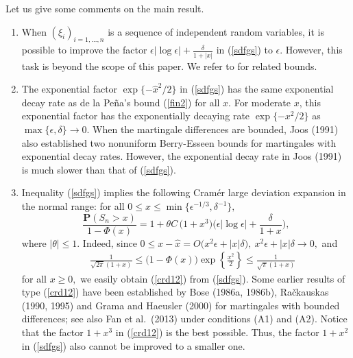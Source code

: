 \documentclass{gSTA2e}
\theoremstyle{plain}
\theoremstyle{definition}
\theoremstyle{remark}
\begin{document}
Let us give some  comments on the main result.
\begin{enumerate}
\item When  $(\xi _i)_{i=1,...,n}$
is a sequence of independent random variables, it is possible to improve the factor $  \epsilon|\log \epsilon| +\frac{\delta }{1 +|x| } $ in (\ref{sdfgs})  to  $\epsilon.$    However, this task is beyond the scope of this paper.
We refer to \cite{FGL14} for related bounds.


\item The exponential factor  $\exp\{- \widehat{x}^2/2 \}$ in (\ref{sdfgs}) has the same exponential decay rate as de la Pe\~{n}a's bound (\ref{fin2}) for all $x.$  For moderate $x$, this  exponential factor  has the exponentially decaying rate $\exp\{-x^2/2\}$ as $\max\{\epsilon, \delta\}\rightarrow 0$.
When the martingale differences are bounded, Joos (1991)  also established two nonuniform Berry-Esseen bounds for martingales with exponential decay rates. However, the  exponential decay rate  in Joos (1991) is much slower than that  of  (\ref{sdfgs}).

\item Inequality (\ref{sdfgs})  implies the following Cram\'{e}r large deviation expansion in the normal range: for all $0 \leq x  \leq \min\{\epsilon^{-1/3}, \delta^{-1} \},$
\begin{equation}\label{crd12}
\frac{\mathbf{P}(S_n > x)}{ 1- \Phi \left( x\right)}=  1 + \theta C\,\Big( 1+ x^3 \Big)\Big(  \epsilon|\log \epsilon| +\frac{\delta }{1 +x   } \Big),
\end{equation}
where $|\theta|\leq 1$.    Indeed, since $
0\leq x-\widehat{x}=O\Big(x^2\epsilon+ |x|\delta \Big), \   x^2\epsilon+ |x|\delta \rightarrow 0,$
and
\begin{eqnarray}
\ \ \ \ \ \  \frac{1}{\sqrt{2\pi}(1+x)}   \leq \Big( 1-\Phi \left( x\right) \Big) \exp\left\{ \frac{x^2}{2}\right\} \leq \frac{1}{\sqrt{\pi}(1+x)} \label{mc}
\end{eqnarray}
for all $x\geq0,$
we easily obtain (\ref{crd12}) from (\ref{sdfgs}). Some earlier results of type (\ref{crd12})  have been established  by Bose (1986a, 1986b), Ra\v{c}kauskas (1990, 1995)  and Grama and Haeusler (2000) for martingales with bounded differences; see also    Fan et al.\ (2013) under conditions (A1) and (A2). Notice that the factor $1+ x^3$ in  (\ref{crd12})
is the best possible. Thus, the factor $1+ x^2$ in (\ref{sdfgs}) also cannot be improved to a smaller one.


\end{enumerate}
\end{document}
